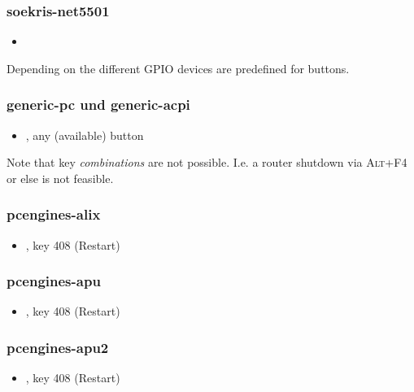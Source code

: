 \subsubsection{soekris-net5501}
\begin{itemize}
  \item {}
\end{itemize}

  Depending on the  different GPIO devices are predefined
  for buttons.

\subsubsection{generic-pc und generic-acpi}
\begin{itemize}
  \item {}, any (available) button
\end{itemize}

Note that key \emph{combinations} are not possible. I.e. a router
shutdown via \textsc{Alt+F4} or else is not feasible.

\subsubsection{pcengines-alix}
\begin{itemize}
  \item {}, key 408 (Restart)
\end{itemize}

\subsubsection{pcengines-apu}
\begin{itemize}
  \item {}, key 408 (Restart)
\end{itemize}

\subsubsection{pcengines-apu2}
\begin{itemize}
  \item {}, key 408 (Restart)
\end{itemize}


